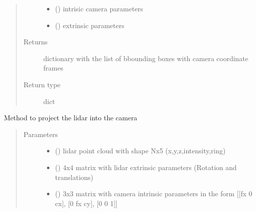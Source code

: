 \documentclass[letterpaper,10pt,english]{sphinxmanual}
\begin{document}
\begin{fulllineitems}
\begin{fulllineitems}
\begin{quote}
\begin{description}
\begin{itemize}
\item {} 
 () \textendash{} intrisic camera parameters

\item {} 
 () \textendash{} extrinsic parameters

\end{itemize}

\item[{Returns}] \leavevmode
dictionary with the list of bbounding boxes with camera coordinate frames

\item[{Return type}] \leavevmode
dict

\end{description}\end{quote}

\end{fulllineitems}


\begin{fulllineitems}
\label{\detokenize{radiate:radiate.Sequence.project_lidar}}
Method to project the lidar into the camera
\begin{quote}\begin{description}
\item[{Parameters}] \leavevmode\begin{itemize}
\item {} 
 () \textendash{} lidar point cloud with shape Nx5 (x,y,z,intensity,ring)

\item {} 
 () \textendash{} 4x4 matrix with lidar extrinsic parameters (Rotation
and translations)

\item {} 
 () \textendash{} 3x3 matrix with camera intrinsic parameters in the form
{[}{[}fx 0 cx{]},
{[}0 fx cy{]},
{[}0 0 1{]}{]}


\end{itemize}
\end{description}
\end{quote}
\end{fulllineitems}
\end{fulllineitems}
\end{document}
